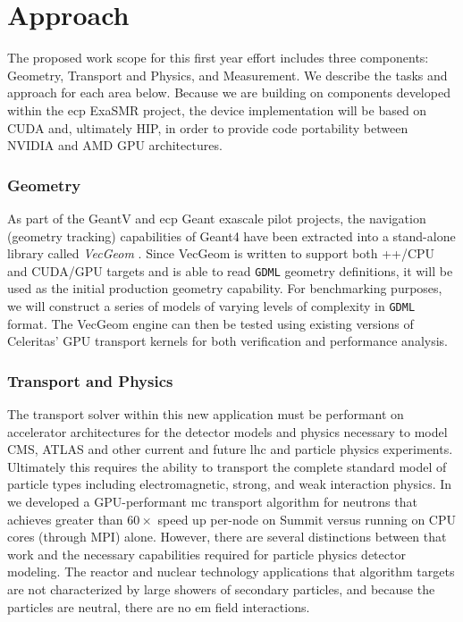 \documentclass[10pt]{article}
\begin{document}
\section*{Approach}

The proposed work scope for this first year effort includes three
components: Geometry, Transport and Physics, and Measurement. We
describe the tasks and approach for each area below. Because we are
building on components developed within the \ac{ecp} ExaSMR project, the
device implementation will be based on CUDA and, ultimately HIP, in
order to provide code portability between NVIDIA and AMD GPU
architectures.

\subsubsection*{Geometry}

As part of the GeantV and \ac{ecp} Geant exascale pilot projects, the navigation
(geometry tracking) capabilities of Geant4 have been extracted into a
stand-alone library called \emph{VecGeom} \cite{apostolakis_towards_2015}.
Since VecGeom is written to support both \C++/CPU and CUDA/GPU targets
and is able to read \texttt{GDML} geometry definitions, it will be used
as the initial production geometry capability. For benchmarking
purposes, we will construct a series of models of varying levels of
complexity in \texttt{GDML} format. The VecGeom engine can then be
tested using existing versions of Celeritas' GPU transport kernels for both
verification and performance analysis. 

\subsubsection*{Transport and Physics}

The transport solver within this new application must be performant on
accelerator architectures for the detector models and physics necessary
to model CMS, ATLAS and other current and future \ac{lhc} and particle
physics experiments. Ultimately this requires the ability to transport
the complete standard model of particle types including electromagnetic,
strong, and weak interaction physics. In \textcite{hamilton_continuous-energy_2019} we
developed a GPU-performant \ac{mc} transport algorithm for neutrons that
achieves greater than $60\times$ speed up per-node on Summit versus
running on CPU cores (through MPI) alone. However, there are several
distinctions between that work and the necessary capabilities required
for particle physics detector modeling. The reactor and nuclear
technology applications that algorithm targets are not characterized by
large showers of secondary particles, and because the particles are
neutral, there are no \ac{em} field interactions.
\end{document}
